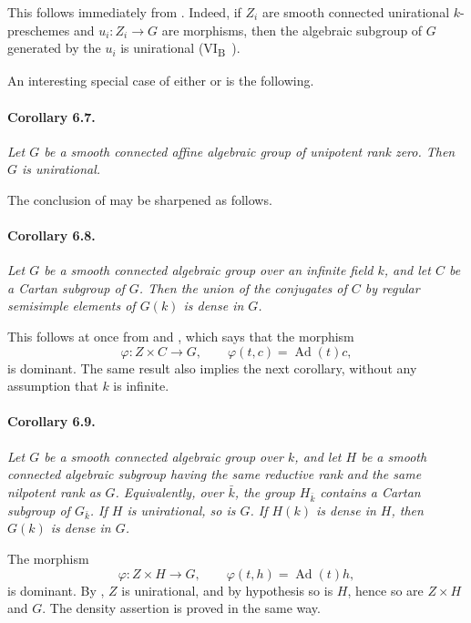 This follows immediately from . Indeed, if \(Z_i\) are smooth
connected unirational \(k\)-preschemes and
\(u_i\colon Z_i\to G\) are morphisms, then the algebraic subgroup
of \(G\) generated by the \(u_i\) is unirational
\textup{(VI\textsubscript{B}~)}.

An interesting special case of either  or  is the
following.

\paragraph{\textbf{Corollary 6.7.}}
{\itshape Let \(G\) be a smooth connected affine algebraic group
of unipotent rank zero. Then \(G\) is unirational.}

The conclusion of  may be sharpened as follows.

\paragraph{\textbf{Corollary 6.8.}}
{\itshape Let \(G\) be a smooth connected algebraic group over an
infinite field \(k\), and let \(C\) be a Cartan subgroup of \(G\).
Then the union of the conjugates of \(C\) by regular semisimple
elements of \(G(k)\) is dense in \(G\).}

This follows at once from  and , which says that the
morphism
\[
  \varphi\colon Z\times C\longrightarrow G,\qquad
  \varphi(t,c)=\operatorname{Ad}(t)c,
\]
is dominant. The same result also implies the next corollary,
without any assumption that \(k\) is infinite.

\paragraph{\textbf{Corollary 6.9.}}
{\itshape Let \(G\) be a smooth connected algebraic group over
\(k\), and let \(H\) be a smooth connected algebraic subgroup
having the same reductive rank and the same nilpotent rank as
\(G\). Equivalently, over \(\bar k\), the group \(H_{\bar k}\)
contains a Cartan subgroup of \(G_{\bar k}\). If \(H\) is
unirational, so is \(G\). If \(H(k)\) is dense in \(H\), then
\(G(k)\) is dense in \(G\).}

The morphism
\[
  \varphi\colon Z\times H\longrightarrow G,\qquad
  \varphi(t,h)=\operatorname{Ad}(t)h,
\]
is dominant. By , \(Z\) is unirational, and by hypothesis so
is \(H\), hence so are \(Z\times H\) and \(G\). The density
assertion is proved in the same way.

